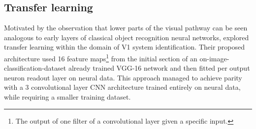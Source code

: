 \subsection{Transfer learning}

Motivated by the observation that lower parts of the visual pathway can be seen analogous to early layers of classical object recognition neural networks, \cite{10.1371/journal.pcbi.1006897} explored transfer learning within the domain of V1 system identification. Their proposed architecture used 16 feature maps\footnote{The output of one filter of a convolutional layer given a specific input.} from the initial section of an on-image-classification-dataset already trained VGG-16 network \citep{VGG16} and then fitted per output neuron readout layer on neural data. This approach managed to achieve parity with a 3 convolutional layer CNN architecture trained entirely on neural data, while requiring a smaller training dataset.
